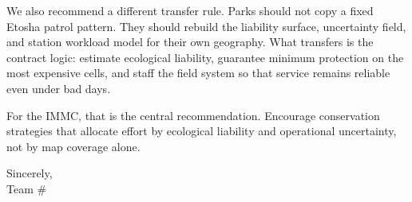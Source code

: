 We also recommend a different transfer rule. Parks should not copy a fixed Etosha patrol pattern. They should rebuild the liability surface, uncertainty field, and station workload model for their own geography. What transfers is the contract logic: estimate ecological liability, guarantee minimum protection on the most expensive cells, and staff the field system so that service remains reliable even under bad days.

For the IMMC, that is the central recommendation. Encourage conservation strategies that allocate effort by ecological liability and operational uncertainty, not by map coverage alone.

Sincerely,\\
Team \#\teamnumber

\newpage

